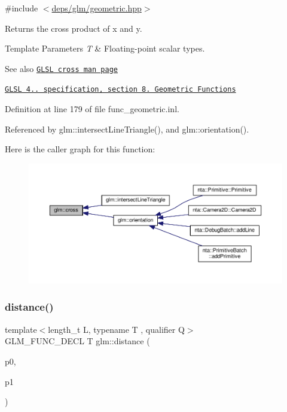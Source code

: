 {\ttfamily \#include $<$\hyperlink{geometric_8hpp}{deps/glm/geometric.\+hpp}$>$}

Returns the cross product of x and y.


\begin{DoxyTemplParams}{Template Parameters}
{\em T} & Floating-\/point scalar types.\\
\hline
\end{DoxyTemplParams}
\begin{DoxySeeAlso}{See also}
\href{http://www.opengl.org/sdk/docs/manglsl/xhtml/cross.xml}{\tt G\+L\+SL cross man page} 

\href{http://www.opengl.org/registry/doc/GLSLangSpec.4.20.8.pdf}{\tt G\+L\+SL 4.. specification, section 8. Geometric Functions} 
\end{DoxySeeAlso}


Definition at line 179 of file func\+\_\+geometric.\+inl.



Referenced by glm\+::intersect\+Line\+Triangle(), and glm\+::orientation().

Here is the caller graph for this function\+:
\nopagebreak
\begin{figure}[H]
\begin{center}
\leavevmode
\includegraphics[width=350pt]{d6/da9/group__core__func__geometric_gaeeec0794212fe84fc9d261de067c9587_icgraph}
\end{center}
\end{figure}
\mbox{\label{group__core__func__geometric_gaa68de6c53e20dfb2dac2d20197562e3f}} 
\subsubsection{\texorpdfstring{distance()}{distance()}}
{\footnotesize\ttfamily template$<$length\+\_\+t L, typename T , qualifier Q$>$ \\
G\+L\+M\+\_\+\+F\+U\+N\+C\+\_\+\+D\+E\+CL T glm\+::distance (\begin{DoxyParamCaption}\item[{\hyperlink{structglm_1_1vec}{vec}$<$ L, T, Q $>$ const \&}]{p0,  }\item[{\hyperlink{structglm_1_1vec}{vec}$<$ L, T, Q $>$ const \&}]{p1 }\end{DoxyParamCaption})}



